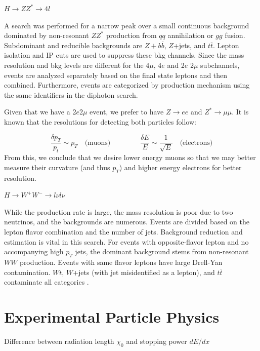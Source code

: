 \vspace{1em}
\noindent \underline{$H \rightarrow ZZ^* \rightarrow 4l$}

\vspace{1em}
\noindent A search was performed for a narrow peak over a small continuous background dominated by non-resonant $ZZ^*$ production from $qq$ annihilation or $gg$ fusion. Subdominant and reducible backgrounds are $Z+b \overline{b}$, $Z$+jets, and $t \overline{t}$. Lepton isolation and IP cuts are used to suppress these bkg channels. Since the mass resolution and bkg levels are different for the 4$\mu$, 4$e$ and 2$e$ 2$\mu$ subchannels, events are analyzed separately based on the final state leptons and then combined. Furthermore, events are categorized by production mechanism using the same identifiers in the diphoton search.

\vspace{1em}
\noindent Given that we have a 2$e$2$\mu$ event, we prefer to have $Z \rightarrow ee$ and $Z^* \rightarrow \mu \mu$. It is known that the resolutions for detecting both particles follow:


\begin{equation}
\frac{\delta p_T}{p_t} \sim p_T \quad \text{(muons)} \qquad \qquad \
\frac{\delta E}{E} \sim \frac{1}{\sqrt{E}} \quad \text{(electrons)}
\end{equation}
From this, we conclude that we desire lower energy muons so that we may better measure their curvature (and thus $p_T$) and higher energy electrons for better resolution.

\vspace{1em}
\noindent \underline{$H \rightarrow W^+W^- \rightarrow l \nu l \nu$}

\vspace{1em}
\noindent While the production rate is large, the mass resolution is poor due to two neutrinos, and the backgrounds are numerous. Events are divided based on the lepton flavor combination and the number of jets. Background reduction and estimation is vital in this search. For events with opposite-flavor lepton and no accompanying high $p_T$ jets, the dominant background stems from non-resonant $WW$ production. Events with same flavor leptons have large Drell-Yan contamination. $Wt$, $W$+jets (with jet misidentified as a lepton), and $t\overline{t}$ contaminate all categories \cite{bstone}.

\chapter{Experimental Particle Physics}
Difference between radiation length $\chi_0$ and stopping power $dE/dx$

